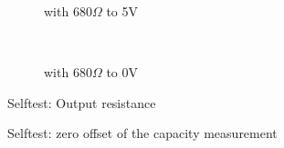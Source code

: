 \begin{figure}[H]
  \begin{subfigure}[b]{9cm}
  \centering
    \resizebox{9cm}{!}{}
    \caption{with \(680 \Omega\) to 5V}
    \label{fig:SelfTRoL}
  \end{subfigure}
  ~
  \begin{subfigure}[b]{9cm}
  \centering
    \resizebox{9cm}{!}{}
    \caption{with \(680 \Omega\) to 0V}
    \label{fig:SelfTRoH}
  \end{subfigure}
  \caption{Selftest: Output resistance}
\end{figure}

\begin{figure}[H]
  \centering
  \resizebox{9cm}{!}{}
  \caption{Selftest: zero offset of the capacity measurement}
  \label{fig:SelfTcap}
\end{figure}


